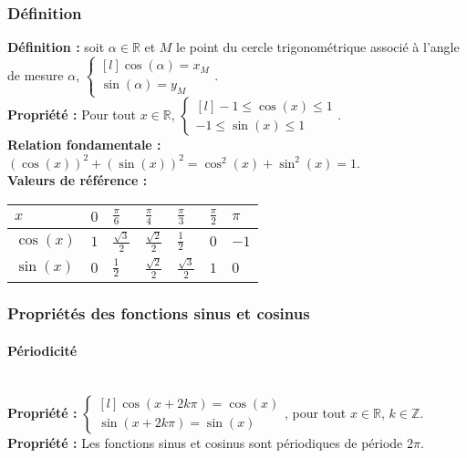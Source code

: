 \documentclass[a4paper,titlepage]{article}
\begin{document}
        \subsubsection{Définition}
            \textbf{Définition :} soit $\alpha\in\mathbb{R}$ et $M$ le point du cercle trigonométrique associé à l’angle de mesure $\alpha$, $\left\{\begin{smallmatrix*}[l]\cos\left(\alpha\right)=x_{M}\\\sin\left(\alpha\right)=y_{M}\end{smallmatrix*}\!\right.$.
            \\
            \textbf{Propriété :} Pour tout $x\in\mathbb{R}$, $\left\{\begin{smallmatrix*}[l]-1\leqslant\cos\left(x\right)\leqslant1\\-1\leqslant\sin\left(x\right)\leqslant1\end{smallmatrix*}\!\right.$.
            \\
            \textbf{Relation fondamentale :} $\left(\cos\left(x\right)\right)^{2}+\left(\sin\left(x\right)\right)^{2}=\cos^{2}\left(x\right)+\sin^{2}\left(x\right)=1$.
            \\
            \textbf{Valeurs de référence :}
            \\
            \begin{tabularx}{\linewidth}{|Y|Y|Y|Y|Y|Y|Y|}
                \hline
                $x$&$0$&$\frac{\pi}{6}$&$\frac{\pi}{4}$&$\frac{\pi}{3}$&$\frac{\pi}{2}$&$\pi$\\
                \hline
                $\cos\left(x\right)$&$1$&$\frac{\sqrt{3}}{2}$&$\frac{\sqrt{2}}{2}$&$\frac{1}{2}$&$0$&$-1$\\
                \hline
                $\sin\left(x\right)$&$0$&$\frac{1}{2}$&$\frac{\sqrt{2}}{2}$&$\frac{\sqrt{3}}{2}$&$1$&$0$\\
                \hline
            \end{tabularx}
        \subsubsection{Propriétés des fonctions sinus et cosinus}
            \paragraph{Périodicité}\mbox{}\\
                \textbf{Propriété :} $\left\{\begin{smallmatrix*}[l]\cos\left(x+2k\pi\right)=\cos\left(x\right)\\\sin\left(x+2k\pi\right)=\sin\left(x\right)\end{smallmatrix*}\!\right.$, pour tout $x\in\mathbb{R}$, $k\in\mathbb{Z}$.
                \\
                \textbf{Propriété :} Les fonctions sinus et cosinus sont périodiques de période $2\pi$.
\end{document}
